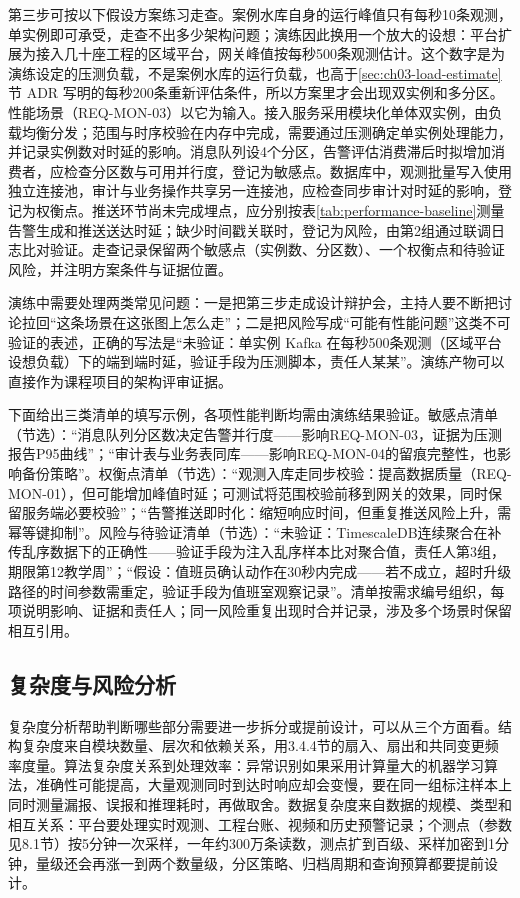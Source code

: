 第三步可按以下假设方案练习走查。案例水库自身的运行峰值只有每秒10条观测，单实例即可承受，走查不出多少架构问题；演练因此换用一个放大的设想：平台扩展为接入几十座工程的区域平台，网关峰值按每秒500条观测估计。这个数字是为演练设定的压测负载，不是案例水库的运行负载，也高于\ref{sec:ch03-load-estimate}节 ADR 写明的每秒200条重新评估条件，所以方案里才会出现双实例和多分区。性能场景（REQ-MON-03）以它为输入。接入服务采用模块化单体双实例，由负载均衡分发；范围与时序校验在内存中完成，需要通过压测确定单实例处理能力，并记录实例数对时延的影响。消息队列设4个分区，告警评估消费滞后时拟增加消费者，应检查分区数与可用并行度，登记为敏感点。数据库中，观测批量写入使用独立连接池，审计与业务操作共享另一连接池，应检查同步审计对时延的影响，登记为权衡点。推送环节尚未完成埋点，应分别按表\ref{tab:performance-baseline}测量告警生成和推送送达时延；缺少时间戳关联时，登记为风险，由第2组通过联调日志比对验证。走查记录保留两个敏感点（实例数、分区数）、一个权衡点和待验证风险，并注明方案条件与证据位置。

演练中需要处理两类常见问题：一是把第三步走成设计辩护会，主持人要不断把讨论拉回“这条场景在这张图上怎么走”；二是把风险写成“可能有性能问题”这类不可验证的表述，正确的写法是“未验证：单实例 Kafka 在每秒500条观测（区域平台设想负载）下的端到端时延，验证手段为压测脚本，责任人某某”。演练产物可以直接作为课程项目的架构评审证据。

下面给出三类清单的填写示例，各项性能判断均需由演练结果验证。敏感点清单（节选）：“消息队列分区数决定告警并行度——影响REQ-MON-03，证据为压测报告P95曲线”；“审计表与业务表同库——影响REQ-MON-04的留痕完整性，也影响备份策略”。权衡点清单（节选）：“观测入库走同步校验：提高数据质量（REQ-MON-01），但可能增加峰值时延；可测试将范围校验前移到网关的效果，同时保留服务端必要校验”；“告警推送即时化：缩短响应时间，但重复推送风险上升，需幂等键抑制”。风险与待验证清单（节选）：“未验证：TimescaleDB连续聚合在补传乱序数据下的正确性——验证手段为注入乱序样本比对聚合值，责任人第3组，期限第12教学周”；“假设：值班员确认动作在30秒内完成——若不成立，超时升级路径的时间参数需重定，验证手段为值班室观察记录”。清单按需求编号组织，每项说明影响、证据和责任人；同一风险重复出现时合并记录，涉及多个场景时保留相互引用。

\subsection{复杂度与风险分析}

复杂度分析帮助判断哪些部分需要进一步拆分或提前设计，可以从三个方面看。结构复杂度来自模块数量、层次和依赖关系，用3.4.4节的扇入、扇出和共同变更频率度量。算法复杂度关系到处理效率：异常识别如果采用计算量大的机器学习算法，准确性可能提高，大量观测同时到达时响应却会变慢，要在同一组标注样本上同时测量漏报、误报和推理耗时，再做取舍。数据复杂度来自数据的规模、类型和相互关系：平台要处理实时观测、工程台账、视频和历史预警记录；\cpStationCount 个测点（参数见8.1节）按5分钟一次采样，一年约300万条读数，测点扩到百级、采样加密到1分钟，量级还会再涨一到两个数量级，分区策略、归档周期和查询预算都要提前设计。


